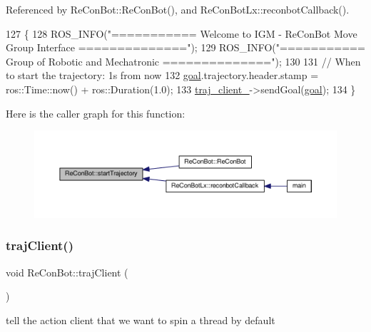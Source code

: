 Referenced by Re\+Con\+Bot\+::\+Re\+Con\+Bot(), and Re\+Con\+Bot\+Lx\+::reconbot\+Callback().


\begin{DoxyCode}
127                                                                         \{
128   ROS\_INFO(\textcolor{stringliteral}{"=========== Welcome to IGM - ReConBot Move Group Interface =============="});
129   ROS\_INFO(\textcolor{stringliteral}{"=========== Group of Robotic and Mechatronic               =============="});
130 
131     \textcolor{comment}{// When to start the trajectory: 1s from now}
132     \hyperlink{class_re_con_bot_a9bd1c7ddf2376e2e68ea5d8bd8c3f505}{goal}.trajectory.header.stamp = ros::Time::now() + ros::Duration(1.0);
133     \hyperlink{class_re_con_bot_a14a35ad6ca284af7db7228d7872720d1}{traj\_client\_}->sendGoal(\hyperlink{class_re_con_bot_a9bd1c7ddf2376e2e68ea5d8bd8c3f505}{goal});
134   \}
\end{DoxyCode}
Here is the caller graph for this function\+:
\nopagebreak
\begin{figure}[H]
\begin{center}
\leavevmode
\includegraphics[width=350pt]{d9/d0b/class_re_con_bot_ade3eb1a4752d45659321209f5730cef3_icgraph}
\end{center}
\end{figure}
\mbox{\label{class_re_con_bot_ab859fa96532995d3c1545aaa9db1802e}} 
\subsubsection{\texorpdfstring{traj\+Client()}{trajClient()}}
{\footnotesize\ttfamily void Re\+Con\+Bot\+::traj\+Client (\begin{DoxyParamCaption}{ }\end{DoxyParamCaption})\hspace{0.3cm}{\ttfamily [inherited]}}

tell the action client that we want to spin a thread by default

